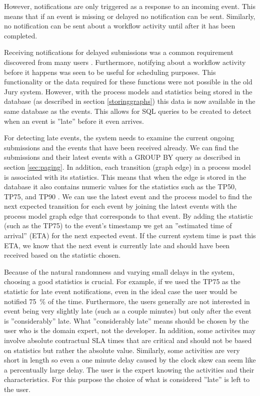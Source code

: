 However, notifications are only triggered as a response to an incoming event.
This means that if an event is missing or delayed no notification can be sent.
Similarly, no notification can be sent about a workflow activity until after it has been completed.

Receiving notifications for delayed submissions was a common requirement discovered from many users .
Furthermore, notifying about a workflow activity before it happens was seen to be useful for scheduling purposes.
This functionality or the data required for these functions were not possible in the old Jury system.
However, with the process models and statistics being stored in the database (as described in section \ref{storinggraphs}) this data is now available in the same database as the events.
This allows for SQL queries to be created to detect when an event is ''late'' before it even arrives.

For detecting late events, the system needs to examine the current ongoing submissions and the events that have been received already.
We can find the submissions and their latest events with a GROUP BY query as described in section \ref{sec:paging}.
In addition, each transition (graph edge) in a process model is associated with its statistics. 
This means that when the edge is stored in the database it also contains numeric values for the statistics such as the TP50, TP75, and TP90 .
We can use the latest event and the process model to find the next expected transition for each event by joining the latest events with the process model graph edge that corresponds to that event.
By adding the statistic (such as the TP75) to the event's timestamp we get an ''estimated time of arrival'' (ETA) for the next expected event.
If the current system time is past this ETA, we know that the next event is currently late and should have been received based on the statistic chosen.

Because of the natural randomness and varying small delays in the system, choosing a good statistics is crucial. 
For example, if we used the TP75 as the statistic for late event notifications, even in the ideal case the user would be notified 75~\% of the time.
Furthermore, the users generally are not interested in event being very slightly late (such as a couple minutes) but only after the event is ''considerably'' late.
What ''considerably late'' means should be chosen by the user who is the domain expert, not the developer.
In addition, some activites may involve absolute contractual SLA times that are critical and should not be based on statistics but rather the absolute value.
Similarly, some activities are very short in length so even a one minute delay caused by the clock skew can seem like a percentually large delay.
The user is the expert knowing the activities and their characteristics.
For this purpose the choice of what is considered ''late'' is left to the user.

